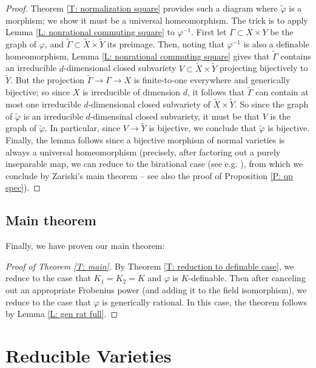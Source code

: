 \documentclass{amsart}
\theoremstyle{definition}
\begin{document}
\begin{proof}
    Theorem \ref{T: normalization square} provides such a diagram where $\tilde\varphi$ is a morphism; we show it must be a universal homeomorphism. The trick is to apply Lemma \ref{L: nonrational commuting square} to $\varphi^{-1}$. First let $\Gamma\subset X\times Y$ be the graph of $\varphi$, and $\widetilde\Gamma\subset\widetilde X\times\widetilde Y$ its preimage. Then, noting that $\varphi^{-1}$ is also a definable homeomorphism, Lemma \ref{L: nonrational commuting square} gives that $\widetilde\Gamma$ contains an irreducible $d$-dimensional closed subvariety $V\subset\widetilde X\times\widetilde Y$ projecting bijectively to $\widetilde Y$. But the projection $\widetilde\Gamma\rightarrow\Gamma\rightarrow X$ is finite-to-one everywhere and generically bijective; so since $X$ is irreducible of dimension $d$, it follows that $\widetilde\Gamma$ can contain at most one irreducible $d$-dimensional closed subvariety of $\widetilde X\times\widetilde Y$. So since the graph of $\tilde\varphi$ is an irreducible $d$-dimensinal closed subvariety, it must be that $V$ is the graph of $\tilde\varphi$. In particular, since $V\rightarrow\widetilde Y$ is bijective, we conclude that $\tilde\varphi$ is bijective. Finally, the lemma follows since a bijective morphism of normal varieties is always a universal homeomorphism (precisely, after factoring out a purely inseparable map, we can reduce to the birational case (see e.g. \cite[Lemma 9.26]{CasHasYe}), from which we conclude by Zariski's main theorem -- see also the proof of Proposition \ref{P: qp spec}). 
\end{proof}

\subsection{Main theorem}

Finally, we have proven our main theorem:

\begin{proof}[Proof of Theorem \ref{T: main}]
By Theorem \ref{T: reduction to definable case}, we reduce to the case that $K_1=K_2=K$ and $\varphi$ is $K$-definable. Then after canceling out an appropriate Frobenius power (and adding it to the field isomorphism), we reduce to the case that $\varphi$ is generically rational. In this case, the theorem follows by Lemma \ref{L: gen rat full}.
\end{proof}

\section{Reducible Varieties}
\end{document}
